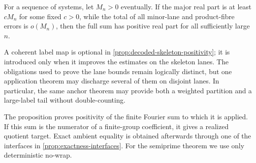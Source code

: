 For a sequence of systems, let $M_n>0$ eventually.  If the major real part is at least $cM_n$ for some fixed $c>0$, while the total of all minor-lane and product-fibre errors is $o(M_n)$, then the full sum has positive real part for all sufficiently large $n$.

A coherent label map is optional in \cref{prop:decoded-skeleton-positivity}; it is introduced only when it improves the estimates on the skeleton lanes.  The obligations used to prove the lane bounds remain logically distinct, but one application theorem may discharge several of them on disjoint lanes.  In particular, the same anchor theorem may provide both a weighted partition and a large-label tail without double-counting.

The proposition proves positivity of the finite Fourier sum to which it is applied.  If this sum is the numerator of a finite-group coefficient, it gives a realized quotient target.  Exact ambient equality is obtained afterwards through one of the interfaces in \cref{prop:exactness-interfaces}.  For the semiprime theorem we use only deterministic no-wrap.
